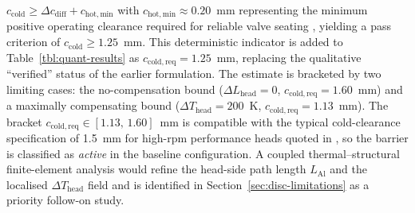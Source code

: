 $c_{\mathrm{cold}}\geq \Delta c_{\mathrm{diff}}+c_{\mathrm{hot,min}}$
with $c_{\mathrm{hot,min}}\approx 0.20$~mm representing the minimum
positive operating clearance required for reliable valve seating
\citep{heisler2002}, yielding a pass criterion of
$c_{\mathrm{cold}}\geq 1.25$~mm. This deterministic indicator is
added to Table~\ref{tbl:quant-results} as
$c_{\mathrm{cold,req}}=1.25$~mm, replacing the qualitative
``verified'' status of the earlier formulation. The estimate is
bracketed by two limiting cases: the no-compensation bound
($\Delta L_{\mathrm{head}}=0$, $c_{\mathrm{cold,req}}=1.60$~mm) and
a maximally compensating bound ($\Delta T_{\mathrm{head}}=200$~K,
$c_{\mathrm{cold,req}}=1.13$~mm). The bracket
$c_{\mathrm{cold,req}}\in [1.13,\,1.60]$~mm is compatible with the
typical cold-clearance specification of 1.5~mm for high-rpm
performance heads quoted in \citet{heisler2002}, so the barrier is
classified as \emph{active} in the baseline configuration. A
coupled thermal--structural finite-element analysis would refine
the head-side path length $L_{\mathrm{Al}}$ and the localised
$\Delta T_{\mathrm{head}}$ field and is identified in
Section~\ref{sec:disc-limitations} as a priority follow-on study.

